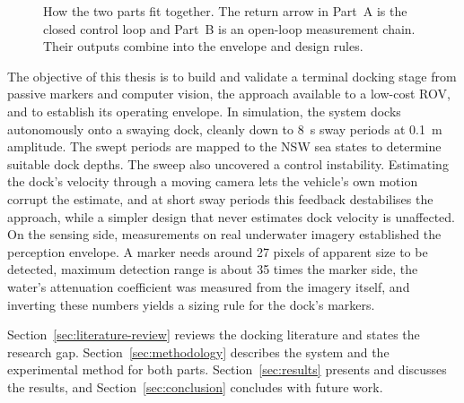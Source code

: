 \begin{figure}[H]
    \centering
    
    \caption{How the two parts fit together. The return arrow in Part~A is
        the closed control loop and Part~B is an open-loop measurement chain.
        Their outputs combine into the envelope and design rules.}
    \label{fig:workflow}
\end{figure}

The objective of this thesis is to build and validate a terminal docking stage from passive markers and computer vision, the approach available to a low-cost ROV, and to establish its operating envelope. In simulation, the system docks autonomously onto a swaying dock, cleanly down to 8~s sway periods at 0.1~m amplitude. The swept periods are mapped to the NSW sea states to determine suitable dock depths. The sweep also uncovered a control instability. Estimating the dock's velocity through a moving camera lets the vehicle's own motion corrupt the estimate, and at short sway periods this feedback destabilises the approach, while a simpler design that never estimates dock velocity is unaffected. On the sensing side, measurements on real underwater imagery established the perception envelope. A marker needs around 27 pixels of apparent size to be detected, maximum detection range is about 35 times the marker side, the water's attenuation coefficient was measured from the imagery itself, and inverting these numbers yields a sizing rule for the dock's markers.

Section~\ref{sec:literature-review} reviews the docking literature and states the research gap. Section~\ref{sec:methodology} describes the system and the experimental method for both parts. Section~\ref{sec:results} presents and discusses the results, and Section~\ref{sec:conclusion} concludes with future work.
